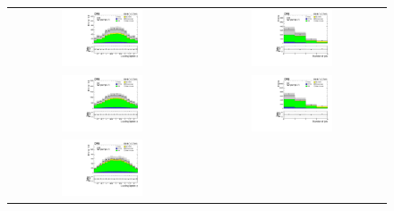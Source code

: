 \begin{figure}[tbh!]
 \begin{center}
 \begin{tabular}{cc}
 \includegraphics[width=0.45\textwidth]{figures/Part3/Nonprompt/VR/eee/lep1Eta}&
 \includegraphics[width=0.45\textwidth]{figures/Part3/Nonprompt/VR/eee/njet} \\
  \includegraphics[width=0.45\textwidth]{figures/Part3/Nonprompt/VR/emul/lep1Eta}&
 \includegraphics[width=0.45\textwidth]{figures/Part3/Nonprompt/VR/emul/njet} \\
  \includegraphics[width=0.45\textwidth]{figures/Part3/Nonprompt/VR/mumumu/lep1Eta}&

\end{tabular}
\end{center}
\end{figure}
